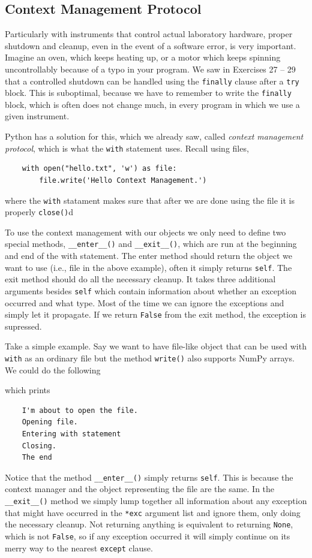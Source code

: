 \documentclass{article}
\newcommand{\ls}[1]{\lstinline{#1}}
\begin{document}
\subsection{Context Management Protocol}
Particularly with instruments that control actual laboratory hardware, proper shutdown and cleanup, even in the event of a software error, is very important. Imagine an oven, which keeps heating up, or a motor which keeps spinning uncontrollably because of a typo in your program. We saw in Exercises 27 -- 29 that a controlled shutdown can be handled using the \ls{finally} clause after a \ls{try} block. This is suboptimal, because we have to remember to write the \ls{finally} block, which is often does not change much, in every program in which we use a given instrument.

Python has a solution for this, which we already saw, called \emph{context management protocol}, which is what the \ls{with} statement uses. Recall using files,
\begin{lstlisting}
    with open("hello.txt", 'w') as file:
        file.write('Hello Context Management.')
\end{lstlisting}
where the \ls{with} statament makes sure that after we are done using the file it is properly \ls{close()}d

To use the context management with our objects we only need to define two special methods, \ls{__enter__()} and \ls{__exit__()}, which are run at the beginning and end of the with statement. The enter method should return the object we want to use (i.e., file in the above example), often it simply returns \ls{self}. The exit method should do all the necessary cleanup. It takes three additional arguments besides \ls{self} which contain information about whether an exception occurred and what type. Most of the time we can ignore the exceptions and simply let it propagate. If we return \ls{False} from the exit method, the exception is supressed.

Take a simple example. Say we want to have file-like object that can be used with \ls{with} as an ordinary file but the method \ls{write()} also supports NumPy arrays. We could do the following

which prints
\begin{verbatim}
    I'm about to open the file.
    Opening file.
    Entering with statement
    Closing.
    The end
\end{verbatim}

Notice that the method \ls{__enter__()} simply returns \ls{self}. This is because the context manager and the object representing the file are the same. In the \ls{__exit__()} method we simply lump together all information about any exception that might have occurred in the \ls{*exc} argument list and ignore them, only doing the necessary cleanup. Not returning anything is equivalent to returning \ls{None}, which is not \ls{False}, so if any exception occurred it will simply continue on its merry way to the nearest \ls{except} clause.
\end{document}

